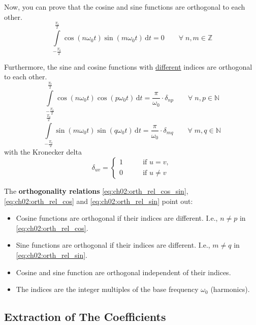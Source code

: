 \begin{refsection}
Now, you can prove that the cosine and sine functions are orthogonal to each other.
\begin{equation}
	\int\limits_{-\frac{T_0}{2}}^{\frac{T_0}{2}} \cos\left(n \omega_0 t\right) \sin\left(m \omega_0 t\right) \, \mathrm{d} t = 0 \qquad \forall \; n, m \in \mathbb{Z}
	\label{eq:ch02:orth_rel_cos_sin}
\end{equation}

Furthermore, the sine and cosine functions with \underline{different} indices are orthogonal to each other.
\begin{equation}
	\int\limits_{-\frac{T_0}{2}}^{\frac{T_0}{2}} \cos\left(n \omega_0 t\right) \cos\left(p \omega_0 t\right) \, \mathrm{d} t = \frac{\pi}{\omega_0} \cdot \delta_{np} \qquad \forall \; n, p \in \mathbb{N}
	\label{eq:ch02:orth_rel_cos}
\end{equation}
\begin{equation}
	\int\limits_{-\frac{T_0}{2}}^{\frac{T_0}{2}} \sin\left(m \omega_0 t\right) \sin\left(q \omega_0 t\right) \, \mathrm{d} t = \frac{\pi}{\omega_0} \cdot \delta_{mq} \qquad \forall \; m, q \in \mathbb{N}
	\label{eq:ch02:orth_rel_sin}
\end{equation}
with the Kronecker delta
\begin{equation}
	\delta_{uv} = \begin{cases}
		1 & \qquad \text{if } u = v, \\
		0 & \qquad \text{if } u \neq v
	\end{cases}
	\label{eq:ch02:kronecker_delta}
\end{equation}

The  \textbf{orthogonality relations} \eqref{eq:ch02:orth_rel_cos_sin}, \eqref{eq:ch02:orth_rel_cos} and \eqref{eq:ch02:orth_rel_sin} point out:
\begin{itemize}
	\item Cosine functions are orthogonal if their indices are different. I.e., $n \neq p$ in \eqref{eq:ch02:orth_rel_cos}.
	\item Sine functions are orthogonal if their indices are different. I.e., $m \neq q$ in \eqref{eq:ch02:orth_rel_sin}.
	\item Cosine and sine function are orthogonal independent of their indices.
	\item The indices are the integer multiples of the base frequency $\omega_0$ (harmonics).
\end{itemize}

\subsection{Extraction of The Coefficients}


\end{refsection}
